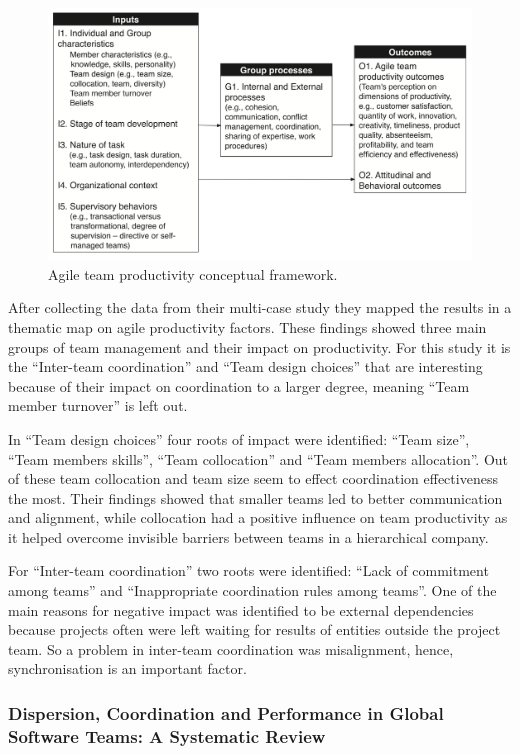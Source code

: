 \begin{figure}
\centering
\includegraphics[width=150mm]{images/IPO.png}
\caption{Agile team productivity conceptual framework.}
\label{atpcf}
\end{figure}

After collecting the data from their multi-case study they mapped the results in a thematic map on agile productivity factors. These findings showed three main groups of team management and their impact on productivity. For this study it is the ``Inter-team coordination'' and ``Team design choices'' that are interesting because of their impact on coordination to a larger degree, meaning ``Team member turnover'' is left out. 

In ``Team design choices'' four roots of impact were identified: ``Team size'', ``Team members skills'', ``Team collocation'' and ``Team members allocation''. Out of these team collocation and team size seem to effect coordination effectiveness the most. Their findings showed that smaller teams led to better communication and alignment, while collocation had a positive influence on team productivity as it helped overcome invisible barriers between teams in a hierarchical company.

For ``Inter-team coordination'' two roots were identified: ``Lack of commitment among teams'' and ``Inappropriate coordination rules among teams''. One of the main reasons for negative impact was identified to be external dependencies because projects often were left waiting for results of entities outside the project team. So a problem in inter-team coordination was misalignment, hence, synchronisation is an important factor.

\subsubsection{Dispersion, Coordination and Performance in Global Software Teams: A Systematic Review}

